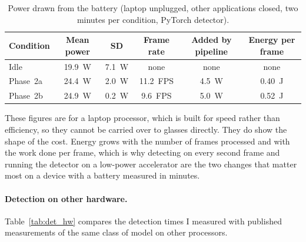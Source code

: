 \begin{table}[htbp]
\begin{singlespace}
\centering
\caption{Power drawn from the battery (laptop unplugged, other applications closed, two
minutes per condition, PyTorch detector).}
\label{tab:power_draw}
\renewcommand{\arraystretch}{1.3}
\begin{tabular}{@{}lccccc@{}}
\toprule
\textbf{Condition} & \textbf{Mean power} & \textbf{SD} & \textbf{Frame rate} &
\textbf{Added by pipeline} & \textbf{Energy per frame} \\
\midrule
Idle      & 19.9~W & 7.1~W & none     & none   & none \\
Phase~2a  & 24.4~W & 2.0~W & 11.2~FPS & 4.5~W  & 0.40~J \\
Phase~2b  & 24.9~W & 0.2~W & 9.6~FPS  & 5.0~W  & 0.52~J \\
\bottomrule
\end{tabular}
\end{singlespace}
\end{table}

These figures are for a laptop processor, which is built for speed rather than
efficiency, so they cannot be carried over to glasses directly. They do show the shape of
the cost. Energy grows with the number of frames processed and with the work done per
frame, which is why detecting on every second frame and running the detector on a
low-power accelerator are the two changes that matter most on a device with a battery
measured in minutes.

\paragraph{Detection on other hardware.}
Table~\ref{tab:det_hw} compares the detection times I measured with published measurements
of the same class of model on other processors.

